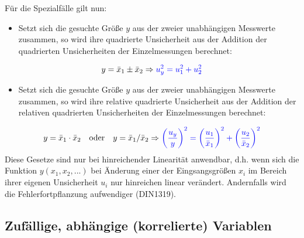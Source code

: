 \documentclass[letterpaper,10pt,english]{jupyterBook}
\begin{document}
\sphinxAtStartPar
Für die Spezialfälle gilt nun:
\begin{itemize}
\item {} 
\sphinxAtStartPar
Setzt sich die gesuchte Größe \(y\) aus der  zweier unabhängigen Messwerte zusammen, so wird ihre quadrierte Unsicherheit aus der Addition der quadrierten Unsicherheiten der Einzelmessungen berechnet:

\end{itemize}
\begin{equation*}
\begin{split}y=\bar x_1 \pm \bar x_2 \Rightarrow  \color{blue}{
   u_y^2 =  u_1^2 + u_2^2 } \end{split}
\end{equation*}\begin{itemize}
\item {} 
\sphinxAtStartPar
Setzt sich die gesuchte Größe \(y\) aus der  zweier unabhängigen Messwerte zusammen, so wird ihre relative quadrierte Unsicherheit aus der Addition der relativen quadrierten Unsicherheiten der Einzelmessungen berechnet:

\end{itemize}
\begin{equation*}
\begin{split}y=\bar x_1 \cdot \bar x_2 \quad \textrm{oder} \quad y=\bar x_1 / \bar x_2 \Rightarrow  \color{blue}{
   \left(\frac{u_y}{y}\right)^2 =  \left(\frac{u_1}{\bar x_1}\right)^2 + \left(\frac{u_2}{\bar x_2} \right)^2}\end{split}
\end{equation*}
\sphinxAtStartPar
{} Diese Gesetze sind nur bei hinreichender Linearität anwendbar, d.h. wenn sich die Funktion \(y(x_1, x_2, ...)\) bei Änderung einer der Eingsangsgrößen \(x_i\) im Bereich ihrer eigenen Unsicherheit \(u_i\) nur hinreichen linear verändert. Andernfalls wird die Fehlerfortpflanzung aufwendiger (DIN1319).


\subsection{Zufällige, abhängige (korrelierte) Variablen }
\label{\detokenize{content/1_Fehlerfortpflanzung:zufallige-abhangige-korrelierte-variablen-a-id-subsec-fehlerfortpflanzung-bei-korrelierten-unsicherheiten-a}}
\end{document}
